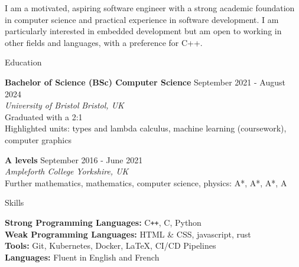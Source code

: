\documentclass{resume} %
\begin{document}


I am a motivated, aspiring software engineer with a strong academic foundation in computer science and practical experience in software development. I am particularly interested in embedded development but am open to working in other fields and languages, with a preference for C++.



\begin{rSection}{Education}

{\bf Bachelor of Science (BSc) Computer Science} \hfill {September 2021 - August 2024} \\
\textit{University of Bristol} \hfill \textit{Bristol, UK} \\
Graduated with a 2:1 \\
Highlighted units: types and lambda calculus, machine learning (coursework), computer graphics

{\bf A levels} \hfill {September 2016 - June 2021} \\
\textit{Ampleforth College} \hfill \textit{Yorkshire, UK} \\
Further mathematics, mathematics, computer science, physics: A*, A*, A*, A

\end{rSection}


\begin{rSection}{Skills}

{\bf Strong Programming Languages:} C\texttt{++}, C, Python\\
{\bf Weak Programming Languages:} HTML \& CSS, javascript, rust \\
{\bf Tools:} Git, Kubernetes, Docker, LaTeX, CI/CD Pipelines \\
{\bf Languages:} Fluent in English and French

\end{rSection}
\end{document}

